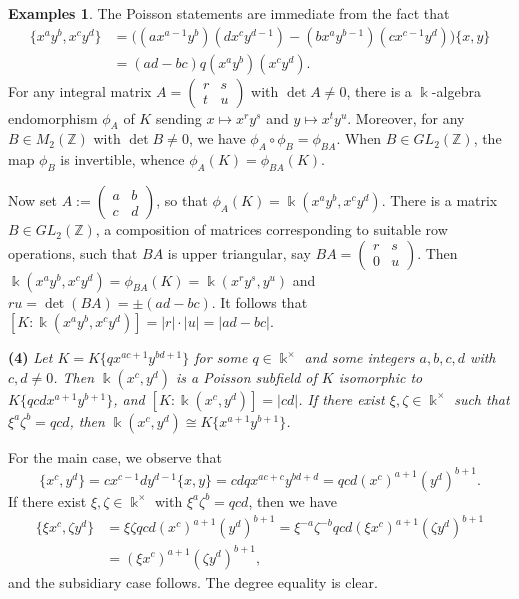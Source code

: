\documentclass[12pt]{amsart}
\theoremstyle{plain}
\numberwithin{theorem}{section}
\numberwithin{equation}{theorem}
\theoremstyle{definition}
\newtheorem{examples}[theorem]{Examples}
\newcommand{\ZZ}{\mathbb{Z}}
\newcommand \kx {\Bbbk^\times}
\begin{document}
\begin{examples}
The Poisson statements are immediate from the fact that
\begin{equation}
\label{E1.5.1}\tag{E1.5.1}
\begin{aligned}
\{ x^ay^b, x^cy^d \} &= \bigl( (ax^{a-1}y^b) (dx^cy^{d-1}) 
- (bx^ay^{b-1}) (cx^{c-1}y^d) \bigr) \{x,y\}  \\
&= (ad-bc) q (x^ay^b) (x^cy^d).
\end{aligned}
\end{equation}
For any integral matrix 
$A=\left( \begin{smallmatrix} r&s\\ t&u \end{smallmatrix}\right)$ 
with $\det A \ne 0$, there is a $\Bbbk$-algebra endomorphism 
$\phi_A$ of $K$ sending $x \mapsto x^ry^s$ and 
$y \mapsto x^ty^u$. Moreover, for any $B \in M_2(\ZZ)$ with 
$\det B \ne 0$, we have $\phi_A \circ \phi_B = \phi_{BA}$. 
When $B \in GL_2(\ZZ)$, the map $\phi_B$ is invertible, 
whence $\phi_A(K) = \phi_{BA}(K)$.

Now set 
$A:=\left(\begin{smallmatrix} a&b\\ c&d\end{smallmatrix}\right)$, 
so that $\phi_A(K) = \Bbbk(x^ay^b, x^cy^d)$. There is a matrix 
$B \in GL_2(\ZZ)$, a composition of matrices corresponding to 
suitable row operations, such that $BA$ is upper triangular, 
say 
$BA=\left( \begin{smallmatrix} r&s\\ 0&u \end{smallmatrix}\right)$. 
Then $\Bbbk(x^ay^b, x^cy^d) = \phi_{BA}(K) = \Bbbk(x^ry^s, y^u)$ 
and $ru = \det(BA) = \pm(ad-bc)$. It follows that 
$[K: \Bbbk(x^ay^b, x^cy^d)] = |r|\cdot|u| = |ad-bc|$.

\textbf{(4)}
\emph{Let $K = K\{qx^{ac+1}y^{bd+1}\}$ for some $q \in \kx$ and 
some integers $a,b,c,d$ with $c,d \ne 0$. Then $\Bbbk(x^c,y^d)$ 
is a Poisson subfield of $K$ isomorphic to 
$K\{qcd x^{a+1} y^{b+1}\}$, and $[K:\Bbbk(x^c,y^d)] = |cd|$. If 
there exist $\xi,\zeta \in \kx$ such that $\xi^a \zeta^b = qcd$, 
then $\Bbbk(x^c,y^d) \cong K\{x^{a+1} y^{b+1}\}$.}

For the main case, we observe that
$$
\{x^c, y^d\} = c x^{c-1} d y^{d-1} \{x,y\} 
= cdq x^{ac+c} y^{bd+d} = qcd (x^c)^{a+1} (y^d)^{b+1}.
$$
If there exist $\xi,\zeta \in \kx$ with $\xi^a \zeta^b 
= qcd$, then we have
\begin{align*}
\{ \xi x^c, \zeta y^d \} 
&= \xi \zeta qcd (x^c)^{a+1} (y^d)^{b+1} 
= \xi^{-a} \zeta^{-b} qcd (\xi x^c)^{a+1} (\zeta y^d)^{b+1}  \\
&= (\xi x^c)^{a+1} (\zeta y^d)^{b+1},
\end{align*}
and the subsidiary case follows. The degree equality is clear.


\end{examples}
\end{document}
